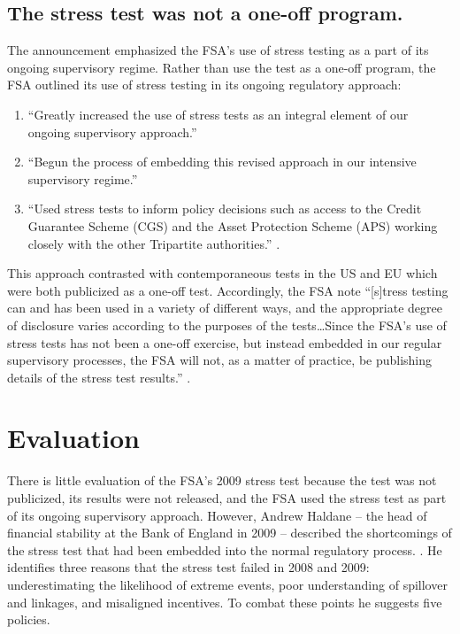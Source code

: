 \documentclass[12pt]{article}
\begin{document}
\subsection{The stress test was not a one-off program.}

The announcement emphasized the FSA's use of stress testing as a part of its ongoing supervisory regime. Rather than use the test as a one-off program, the FSA outlined its use of stress testing in its ongoing regulatory approach:

\begin{enumerate}
  \item ``Greatly increased the use of stress tests as an integral element of our ongoing supervisory approach.''
  \item ``Begun the process of embedding this revised approach in our intensive supervisory regime.''
  \item ``Used stress tests to inform policy decisions such as access to the Credit Guarantee Scheme (CGS) and the Asset Protection Scheme (APS) working closely with the other Tripartite authorities.'' \citep{Results}.
\end{enumerate}

This approach contrasted with contemporaneous tests in the US and EU which were both publicized as a one-off test. Accordingly, the FSA note ``[s]tress testing can and has been used in a variety of different ways, and the appropriate degree of disclosure varies according to the purposes of the tests\dots Since the FSA’s use of stress tests has not been a one-off exercise, but instead embedded in our regular supervisory processes, the FSA will not, as a matter of practice, be publishing details of the stress test results.'' \citep{Results}.

\section{Evaluation}

There is little evaluation of the FSA's 2009 stress test because the test was not publicized, its results were not released, and the FSA used the stress test as part of its ongoing supervisory approach. However, Andrew Haldane -- the head of financial stability at the Bank of England in 2009 -- described the shortcomings of the stress test that had been embedded into the normal regulatory process. \citep{Haldane}. He identifies three reasons that the stress test failed in 2008 and 2009: underestimating the likelihood of extreme events, poor understanding of spillover and linkages, and misaligned incentives. To combat these points he suggests five policies.
\end{document}
